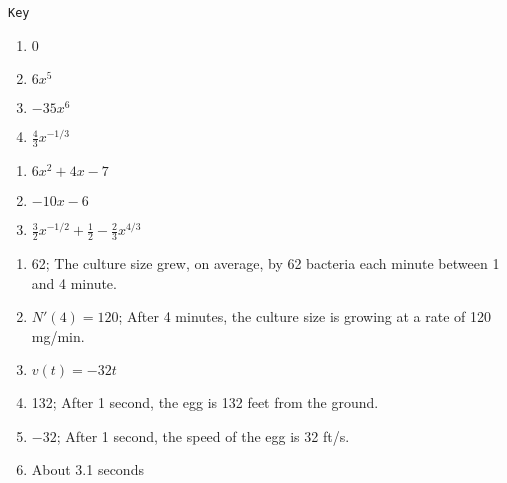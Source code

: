 \documentclass{article}
\newcounter{key}
\begin{document}
\vfill

\dotfill \newline

\texttt{Key}

\begin{multicols}{4}
\begin{enumerate}
    \item 0
    \item $6x^5$
    \item $-35x^6$
    \item $\frac{4}{3}x^{-1/3}$
\end{enumerate}     \setcounter{key}{\value{enumi}}
\end{multicols}
\begin{multicols}{3}
\begin{enumerate}   \setcounter{enumi}{\value{key}}
    \item $6x^2 + 4x - 7$
    \item $-10x - 6$
    \item $\frac{3}{2}x^{-1/2} + \frac{1}{2} - \frac{2}{3}x^{4/3}$
\end{enumerate}     \setcounter{key}{\value{enumi}}
\end{multicols}
\begin{enumerate}   \setcounter{enumi}{\value{key}}
    \item 62; The culture size grew, on average, by 62 bacteria each minute between 1 and 4 minute.
    \item $N'(4) = 120$; After 4 minutes, the culture size is growing at a rate of 120 mg/min.
    \item $v(t) = -32t$
    \item 132; After 1 second, the egg is 132 feet from the ground.
    \item $-32$; After 1 second, the speed of the egg is 32 ft/s.
    \item About 3.1 seconds
\end{enumerate}     \setcounter{key}{\value{enumi}}
\end{document}
